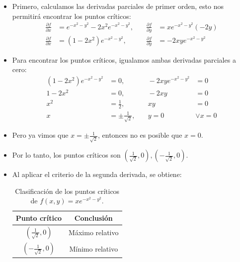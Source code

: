 \begin{itemize}
    \item Primero, calculamos las derivadas parciales de primer orden, esto nos permitirá encontrar los puntos críticos:
    \begin{align*}
        \frac{\partial f}{\partial x} &= e^{-x^2-y^2} - 2x^2e^{-x^2-y^2}, &\quad \frac{\partial f}{\partial y} &= xe^{-x^2-y^2}(-2y)\\
        \frac{\partial f}{\partial x} &= (1- 2x^2)e^{-x^2-y^2}, &\quad \frac{\partial f}{\partial y} &= -2xye^{-x^2-y^2}
    \end{align*}
    \item Para encontrar los puntos críticos, igualamos ambas derivadas parciales a cero:
     \begin{align*}
        (1- 2x^2)e^{-x^2-y^2} &= 0, &\quad -2xye^{-x^2-y^2} &= 0\\
        1- 2x^2 &= 0, &\quad -2xy &= 0\\
        x^2 &= \frac{1}{2}, &\quad xy &= 0\\
        x &= \pm \frac{1}{\sqrt{2}}, &\quad y = 0 &\vee x=0
    \end{align*}
    \item Pero ya vimos que $x=\pm \frac{1}{\sqrt{2}}$, entonces no es posible que $x=0$.
    \item Por lo tanto, los puntos críticos son $(\frac{1}{\sqrt{2}},0), (-\frac{1}{\sqrt{2}},0)$.
    \item Al aplicar el criterio de la segunda derivada, se obtiene:
    \begin{table}[H]
    \centering
    \begin{tabular}{|c|c|}
    \hline
    Punto crítico & Conclusión \\
    \hline
    $(\frac{1}{\sqrt{2}},0)$ & Máximo relativo \\
    \hline
    $(-\frac{1}{\sqrt{2}},0)$ & Mínimo relativo \\
    \hline
    \end{tabular}
     \caption{Clasificación de los puntos críticos de $f(x,y)=xe^{-x^2-y^2}$.}
     \label{tab:clasificacion_puntos_criticos_2}
    \end{table}


\end{itemize}
